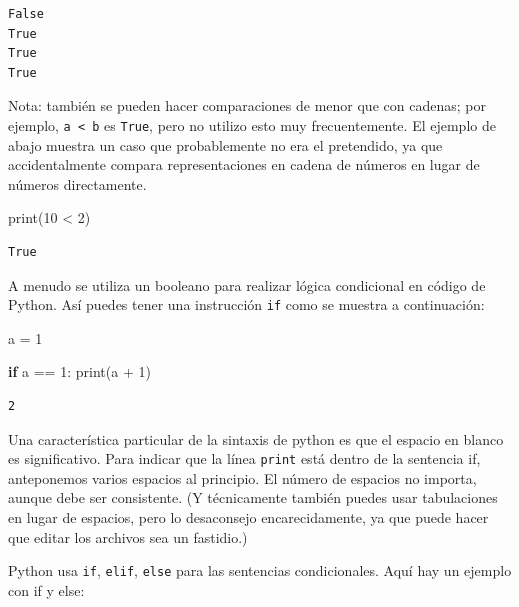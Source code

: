 \documentclass[
  letterpaper,
]{scrbook}
\newenvironment{Shaded}{\begin{snugshade}}{\end{snugshade}}
\newcommand{\BuiltInTok}[1]{\textcolor[rgb]{0.00,0.23,0.31}{#1}}
\newcommand{\ControlFlowTok}[1]{\textcolor[rgb]{0.00,0.23,0.31}{\textbf{#1}}}
\newcommand{\DecValTok}[1]{\textcolor[rgb]{0.68,0.00,0.00}{#1}}
\newcommand{\NormalTok}[1]{\textcolor[rgb]{0.00,0.23,0.31}{#1}}
\newcommand{\OperatorTok}[1]{\textcolor[rgb]{0.37,0.37,0.37}{#1}}
\newcommand{\StringTok}[1]{\textcolor[rgb]{0.13,0.47,0.30}{#1}}
\begin{document}
\begin{verbatim}
False
True
True
True
\end{verbatim}

Nota: también se pueden hacer comparaciones de menor que con cadenas;
por ejemplo,
\texttt{\textquotesingle{}a\textquotesingle{}\ \textless{}\ \textquotesingle{}b\textquotesingle{}}
es \texttt{True}, pero no utilizo esto muy frecuentemente. El ejemplo de
abajo muestra un caso que probablemente no era el pretendido, ya que
accidentalmente compara representaciones en cadena de números en lugar
de números directamente.

\begin{Shaded}
\begin{Highlighting}[]
\BuiltInTok{print}\NormalTok{(}\StringTok{\textquotesingle{}10\textquotesingle{}} \OperatorTok{\textless{}} \StringTok{\textquotesingle{}2\textquotesingle{}}\NormalTok{)}
\end{Highlighting}
\end{Shaded}

\begin{verbatim}
True
\end{verbatim}

A menudo se utiliza un booleano para realizar lógica condicional en
código de Python. Así puedes tener una instrucción \texttt{if} como se
muestra a continuación:

\begin{Shaded}
\begin{Highlighting}[]
\NormalTok{a }\OperatorTok{=} \DecValTok{1}

\ControlFlowTok{if}\NormalTok{ a }\OperatorTok{==} \DecValTok{1}\NormalTok{:}
  \BuiltInTok{print}\NormalTok{(a }\OperatorTok{+} \DecValTok{1}\NormalTok{)}
\end{Highlighting}
\end{Shaded}

\begin{verbatim}
2
\end{verbatim}

Una característica particular de la sintaxis de python es que el espacio
en blanco es significativo. Para indicar que la línea \texttt{print}
está dentro de la sentencia if, anteponemos varios espacios al
principio. El número de espacios no importa, aunque debe ser
consistente. (Y técnicamente también puedes usar tabulaciones en lugar
de espacios, pero lo desaconsejo encarecidamente, ya que puede hacer que
editar los archivos sea un fastidio.)

Python usa \texttt{if}, \texttt{elif}, \texttt{else} para las sentencias
condicionales. Aquí hay un ejemplo con if y else:
\end{document}
